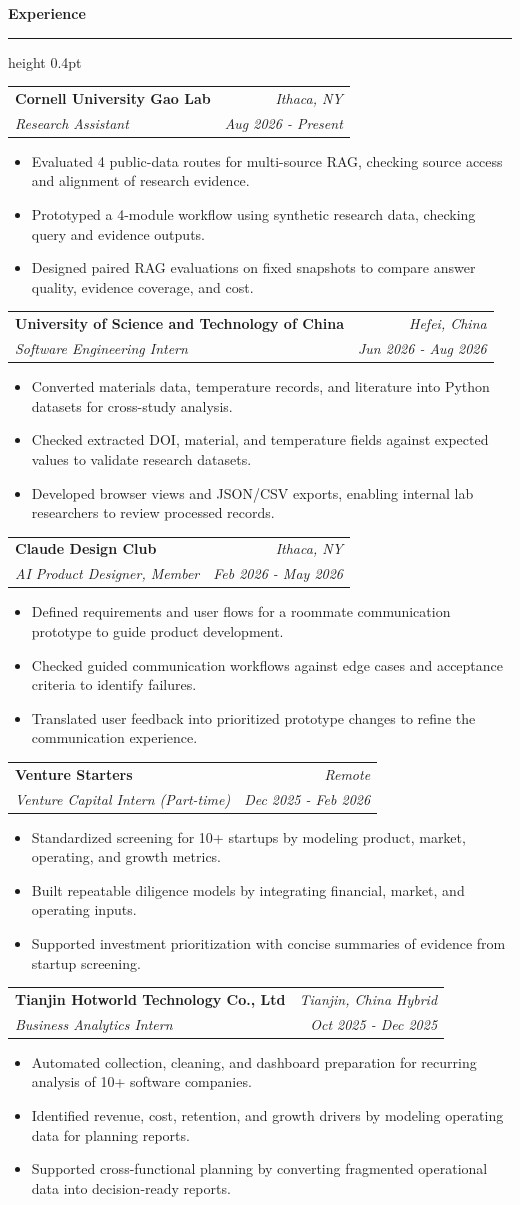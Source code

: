 \documentclass[10pt,letterpaper]{article}
\makeatletter
\newcommand{\resumeSection}[1]{%
  \vspace{3pt}
  {\fontsize{10}{12}\selectfont\bfseries #1}\par
  \vspace{2pt}
  \hrule height 0.4pt
  \vspace{3pt}
}
\newcommand{\resumeEntry}[4]{%
  \hspace{6.7pt}\begin{tabular*}{\dimexpr\textwidth-13.4pt}{@{\extracolsep{\fill}} l r}
    \textbf{#1} & \textit{#2} \\
    \textit{#3} & \textit{#4} \\
  \end{tabular*}
  \par\vspace{-2pt}
}
\newenvironment{resumeBullets}{%
  \begin{itemize}[leftmargin=28pt,rightmargin=6.7pt,label=$\circ$,labelsep=4pt,itemsep=0pt,topsep=0pt,parsep=0pt,partopsep=0pt]
}{%
  \end{itemize}
  \vspace{0pt}
}
\newcommand{\resumeItem}[1]{\item #1}
\makeatother
\begin{document}
\resumeSection{Experience}
\resumeEntry{Cornell University Gao Lab}{Ithaca, NY}{Research Assistant}{Aug 2026 - Present}
\begin{resumeBullets}
  \resumeItem{Evaluated 4 public-data routes for multi-source RAG, checking source access and alignment of research evidence.}
  \resumeItem{Prototyped a 4-module workflow using synthetic research data, checking query and evidence outputs.}
  \resumeItem{Designed paired RAG evaluations on fixed snapshots to compare answer quality, evidence coverage, and cost.}
\end{resumeBullets}
\resumeEntry{University of Science and Technology of China}{Hefei, China}{Software Engineering Intern}{Jun 2026 - Aug 2026}
\begin{resumeBullets}
  \resumeItem{Converted materials data, temperature records, and literature into Python datasets for cross-study analysis.}
  \resumeItem{Checked extracted DOI, material, and temperature fields against expected values to validate research datasets.}
  \resumeItem{Developed browser views and JSON/CSV exports, enabling internal lab researchers to review processed records.}
\end{resumeBullets}
\resumeEntry{Claude Design Club}{Ithaca, NY}{AI Product Designer, Member}{Feb 2026 - May 2026}
\begin{resumeBullets}
  \resumeItem{Defined requirements and user flows for a roommate communication prototype to guide product development.}
  \resumeItem{Checked guided communication workflows against edge cases and acceptance criteria to identify failures.}
  \resumeItem{Translated user feedback into prioritized prototype changes to refine the communication experience.}
\end{resumeBullets}
\resumeEntry{Venture Starters}{Remote}{Venture Capital Intern (Part-time)}{Dec 2025 - Feb 2026}
\begin{resumeBullets}
  \resumeItem{Standardized screening for 10+ startups by modeling product, market, operating, and growth metrics.}
  \resumeItem{Built repeatable diligence models by integrating financial, market, and operating inputs.}
  \resumeItem{Supported investment prioritization with concise summaries of evidence from startup screening.}
\end{resumeBullets}
\resumeEntry{Tianjin Hotworld Technology Co., Ltd}{Tianjin, China \textbar{} Hybrid}{Business Analytics Intern}{Oct 2025 - Dec 2025}
\begin{resumeBullets}
  \resumeItem{Automated collection, cleaning, and dashboard preparation for recurring analysis of 10+ software companies.}
  \resumeItem{Identified revenue, cost, retention, and growth drivers by modeling operating data for planning reports.}
  \resumeItem{Supported cross-functional planning by converting fragmented operational data into decision-ready reports.}
\end{resumeBullets}
\end{document}
